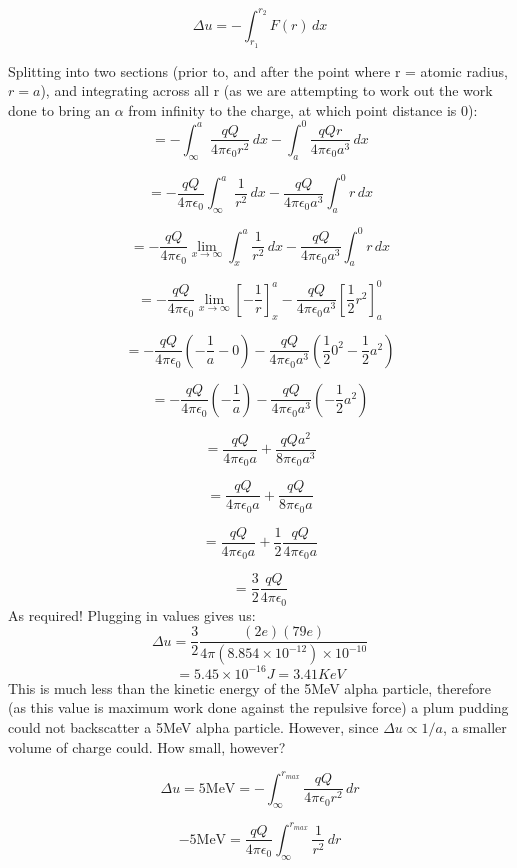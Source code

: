 \[
    \Delta u = - \int_{r_1}^{r_2} F(r) \, dx
\]

Splitting into two sections (prior to, and after the point where r = atomic radius, $r = a$), and integrating across all r (as we are attempting to work out the work done to bring an $\alpha$ from infinity to the charge, at which point distance is 0):
\[
    = -\int_{\infty}^{a} \frac{qQ}{4 \pi \epsilon_0 r^2} \, dx - \int_{a}^{0} \frac{qQr}{4 \pi \epsilon_0 a^3} \, dx
\]

\[
    = -\frac{qQ}{4 \pi \epsilon_0}\int_{\infty}^{a} \frac{1}{r^2} \, dx - \frac{qQ}{4 \pi \epsilon_0 a^3}\int_{a}^{0} r \, dx
\]

\[
    = -\frac{qQ}{4 \pi \epsilon_0} \lim_{x \to \infty} \int_{x}^{a} \frac{1}{r^2} \, dx - \frac{qQ}{4 \pi \epsilon_0 a^3}\int_{a}^{0} r \, dx
\]

\[
        = -\frac{qQ}{4 \pi \epsilon_0} \lim_{x \to \infty} \left[- \frac{1}{r}\right]_x^a - \frac{qQ}{4 \pi \epsilon_0 a^3} \left[\frac{1}{2}r^2\right]_a^0
\]

\[
        = -\frac{qQ}{4 \pi \epsilon_0} \left(-\frac{1}{a} - 0\right) - \frac{qQ}{4 \pi \epsilon_0 a^3} \left(\frac{1}{2}0^2 - \frac{1}{2}a^2\right)
\]

\[
        = -\frac{qQ}{4 \pi \epsilon_0} \left(-\frac{1}{a}\right) - \frac{qQ}{4 \pi \epsilon_0 a^3} \left(- \frac{1}{2}a^2\right)
\]

\[
    = \frac{qQ}{4 \pi \epsilon_0 a} + \frac{qQa^2}{8 \pi \epsilon_0 a^3}
\]

\[
    = \frac{qQ}{4 \pi \epsilon_0 a} + \frac{qQ}{8 \pi \epsilon_0 a}
\]

\[
    = \frac{qQ}{4 \pi \epsilon_0 a} + \frac{1}{2}\frac{qQ}{4 \pi \epsilon_0 a}
\]

\[
    = \frac{3}{2}\frac{qQ}{4 \pi \epsilon_0}
\]
As required! Plugging in values gives us:
\[
    \Delta u = \frac{3}{2} \frac{(2e)(79e)}{4 \pi (8.854 \times 10^{-12}) \times 10^{-10}}
\]
\[
    = 5.45 \times 10^{-16}J = 3.41KeV
\]
This is much less than the kinetic energy of the 5MeV alpha particle, therefore (as this value is maximum work done against the repulsive force) a plum pudding could not backscatter a 5MeV alpha particle. However, since $\Delta u \propto 1/a$, a smaller volume of charge could. How small, however?

\[
    \Delta u = 5 \text{MeV} = -\int_{\infty}^{r_{max}} \frac{qQ}{4 \pi \epsilon_0 r^2} \, dr
\]

\[
    -5 \text{MeV} = \frac{qQ}{4 \pi \epsilon_0}\int_{\infty}^{r_{max}} \frac{1}{r^2} \, dr
\]

